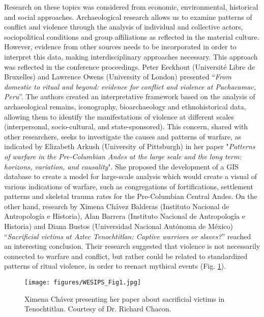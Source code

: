 Research on these topics was considered from economic, environmental, historical and social approaches. Archaeological research allows us to examine patterns of conflict and violence through the analysis of individual and collective actors, sociopolitical conditions and group affiliations as reflected in the material culture. However, evidence from other sources needs to be incorporated in order to interpret this data, making interdisciplinary approaches necessary. This approach was reflected in the conference proceedings. Peter Eeckhout (Université Libre de Bruxelles) and Lawrence Owens (University of London) presented “\emph{From domestic to ritual and beyond: evidence for conflict and violence at Pachacamac, Peru}”. The authors created an interpretative framework based on the analysis of archaeological remains, iconography, bioarchaeology and ethnohistorical data, allowing them to identify the manifestations of violence at different scales (interpersonal, socio-cultural, and state-sponsored). This concern, shared with other researchers, seeks to investigate the causes and patterns of warfare, as indicated by Elizabeth Arkush (University of Pittsburgh) in her paper "\emph{Patterns of warfare in the Pre-Columbian Andes at the large scale and the long term: horizons, variation, and causality}". She proposed the development of a GIS database to create a model for large-scale analysis which would create a visual of various indications of warfare, such as congregations of fortifications, settlement patterns and skeletal trauma rates for the Pre-Columbian Central Andes. On the other hand, research by Ximena Chávez Balderas (Instituto Nacional de Antropología e Historia), Alan Barrera (Instituto Nacional de Antropología e Historia) and Diana Bustos (Universidad Nacional Autónoma de México) “\emph{Sacrificial victims at Aztec Tenochtitlan: Captive warriors or slaves?}” reached an interesting conclusion. Their research suggested that violence is not necessarily connected to warfare and conflict, but rather could be related to standardized patterns of ritual violence, in order to reenact mythical events (Fig. \ref{fig:WESIPS_Fig1}).

	\begin{figure}[!htb]
		\texttt{[image: figures/WESIPS\_Fig1.jpg]}
		\centering
		\caption{Ximena Chávez presenting her paper about sacrificial victims in Tenochtitlan. Courtesy of Dr. Richard Chacon.}
		\label{fig:WESIPS_Fig1}
	\end{figure}

